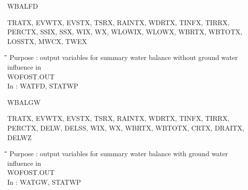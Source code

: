 \bigskip
WBALFD
\testlastline

\begin{indenting}{2.54cm}
TRATX, EVWTX, EVSTX, TSRX, RAINTX, WDRTX, TINFX, TIRRX, PERCTX, SSIX, SSX,
WIX, WX, WLOWIX, WLOWX, WBRTX, WBTOTX, LOSSTX, MWCX, TWEX
\end{indenting}
\begin{tabbing}
\hspace{1.27cm}\=\hspace{1.27cm}\=\hspace{1.27cm}\=\hspace{1.27cm}\=%
\hspace{1.27cm}\=\hspace{1.27cm}\=\hspace{1.27cm}\=\hspace{1.27cm}\=%
\hspace{1.27cm}\=\hspace{1.27cm}\=\kill
\>\> Purpose : output variables for summary water balance without ground water influence in\\
 \>\> \>   WOFOST.OUT\\
\>\> In\> : WATFD, STATWP
\end{tabbing}

\bigskip
WBALGW
\testlastline

\begin{indenting}{2.54cm}
TRATX, EVWTX, EVSTX, TSRX, RAINTX, WDRTX, TINFX, TIRRX, PERCTX, DELW, DELSS,
WIX, WX, WBRTX, WBTOTX, CRTX, DRAITX, DELWZ
\end{indenting}
\begin{tabbing}
\hspace{1.27cm}\=\hspace{1.27cm}\=\hspace{1.27cm}\=\hspace{1.27cm}\=%
\hspace{1.27cm}\=\hspace{1.27cm}\=\hspace{1.27cm}\=\hspace{1.27cm}\=%
\hspace{1.27cm}\=\hspace{1.27cm}\=\kill
\>\> Purpose : output variables for summary water balance with ground water influence in\\
 \>\> \>   WOFOST.OUT\\
\>\> In\> : WATGW, STATWP
\end{tabbing}

